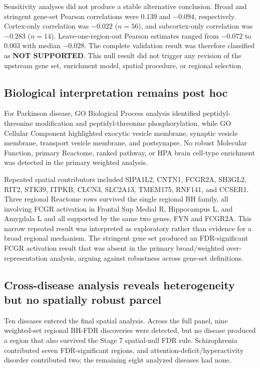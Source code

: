 \documentclass[10pt,twocolumn]{article}
\begin{document}
Sensitivity analyses did not produce a stable alternative conclusion. Broad and stringent gene-set Pearson correlations were 0.139 and $-0.094$, respectively. Cortex-only correlation was $-0.022$ ($n=56$), and subcortex-only correlation was $-0.283$ ($n=14$). Leave-one-region-out Pearson estimates ranged from $-0.072$ to 0.003 with median $-0.028$. The complete validation result was therefore classified as \textbf{NOT SUPPORTED}. This null result did not trigger any revision of the upstream gene set, enrichment model, spatial procedure, or regional selection.

\subsection{Biological interpretation remains post hoc}

For Parkinson disease, GO Biological Process analysis identified peptidyl-threonine modification and peptidyl-threonine phosphorylation, while GO Cellular Component highlighted exocytic vesicle membrane, synaptic vesicle membrane, transport vesicle membrane, and postsynapse. No robust Molecular Function, primary Reactome, ranked pathway, or HPA brain cell-type enrichment was detected in the primary weighted analysis.

Repeated spatial contributors included SIPA1L2, CNTN1, FCGR2A, SH3GL2, RIT2, STK39, ITPKB, CLCN3, SLC2A13, TMEM175, RNF141, and CCSER1. Three regional Reactome rows survived the single regional BH family, all involving FCGR activation in Frontal Sup Medial R, Hippocampus L, and Amygdala L and all supported by the same two genes, FYN and FCGR2A. This narrow repeated result was interpreted as exploratory rather than evidence for a broad regional mechanism. The stringent gene set produced an FDR-significant FCGR activation result that was absent in the primary broad/weighted over-representation analysis, arguing against robustness across gene-set definitions.

\subsection{Cross-disease analysis reveals heterogeneity but no spatially robust parcel}

Ten diseases entered the final spatial analysis. Across the full panel, nine weighted-set regional BH-FDR discoveries were detected, but no disease produced a region that also survived the Stage 7 spatial-null FDR rule. Schizophrenia contributed seven FDR-significant regions, and attention-deficit/hyperactivity disorder contributed two; the remaining eight analyzed diseases had none.
\end{document}
